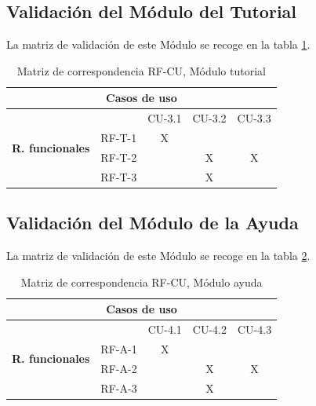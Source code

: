  \subsection{Validación del Módulo del Tutorial}

 La matriz de validación de este Módulo se recoge en la tabla \ref{val3}.

 \begin{table}[H]
 \begin{center}

  \caption{Matriz de correspondencia RF-CU, Módulo tutorial}
 
 \begin{tabular}[c]{| c | c | c | c | c | }
 \hline

   \multicolumn{5}{|c|}{\textbf{Casos de uso}} \\ \hline
   \multirow{4}{0.3cm}{\begin{sideways}\textbf{R. funcionales}\end{sideways}} 
  
  & & CU-3.1 & CU-3.2 & CU-3.3 \\ 
  \cline{2-5}
  &RF-T-1 & X &  &   \\ 
  \cline{2-5}
  &RF-T-2 &  & X & X  \\
  \cline{2-5}
  &RF-T-3 &  & X &   \\    \hline

 \end{tabular}
  \label{val3}
  \end{center}
 \end{table}

 \subsection{Validación del Módulo de la Ayuda}

 La matriz de validación de este Módulo se recoge en la tabla \ref{val4}.

 \begin{table}[H]
 \begin{center}

  \caption{Matriz de correspondencia RF-CU, Módulo ayuda}
 
 \begin{tabular}[c]{| c | c | c | c | c | }
 \hline

   \multicolumn{5}{|c|}{\textbf{Casos de uso}} \\ \hline
   \multirow{5}{0.3cm}{\begin{sideways}\textbf{R.  funcionales}\end{sideways}} 
  
  & & CU-4.1 & CU-4.2 & CU-4.3 \\ 
  \cline{2-5}
  &RF-A-1 & X &  &   \\ 
  \cline{2-5}
  &RF-A-2 &  & X & X  \\
  \cline{2-5}
  &RF-A-3 &  & X &   \\\hline

 \end{tabular}
  \label{val4}
  \end{center}
 \end{table}